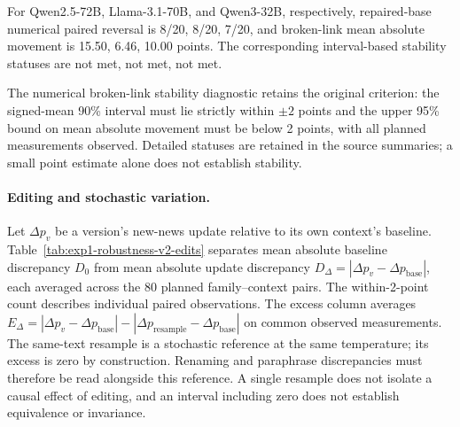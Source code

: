 For Qwen2.5-72B, Llama-3.1-70B, and Qwen3-32B, respectively,
repaired-base numerical paired reversal is 8/20, 8/20, 7/20, and broken-link
mean absolute movement is 15.50, 6.46, 10.00 points. The corresponding
interval-based stability statuses are not met, not met, not met.

The numerical broken-link stability diagnostic retains the original criterion:
the signed-mean 90\% interval must lie strictly within $\pm2$ points and the
upper 95\% bound on mean absolute movement must be below 2 points, with all
planned measurements observed. Detailed statuses are retained in the source
summaries; a small point estimate alone does not establish stability.

\paragraph{Editing and stochastic variation.}
Let $\Delta p_v$ be a version's new-news update relative to its own context's
baseline. Table~\ref{tab:exp1-robustness-v2-edits} separates mean absolute
baseline discrepancy $D_0$ from mean absolute update discrepancy
$D_\Delta=|\Delta p_v-\Delta p_{\mathrm{base}}|$, each averaged across the
80 planned family--context pairs. The within-2-point count describes individual paired observations.
The excess column averages
$E_\Delta=|\Delta p_v-\Delta p_{\mathrm{base}}|
-|\Delta p_{\mathrm{resample}}-\Delta p_{\mathrm{base}}|$
on common observed measurements. The same-text resample is a stochastic
reference at the same temperature; its excess is zero by construction.
Renaming and paraphrase discrepancies must therefore be read alongside this
reference. A single resample does not isolate a causal effect of editing,
and an interval including zero does not establish equivalence or invariance.

\begin{center}
\begin{minipage}{\linewidth}
\centering
{}
\label{tab:exp1-robustness-v2-edits}
\small
\resizebox{\linewidth}{!}{}
\end{minipage}
\end{center}


